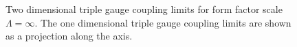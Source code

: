 \begin{figure}[htbp]
\begin{center}
{}
\caption{\label{fig:tgc_limits}
         Two dimensional triple gauge coupling limits for form factor scale $\Lambda=\infty$. The one dimensional triple gauge coupling limits are 
         shown as a projection along the axis.  
}
\end{center}
\end{figure}
